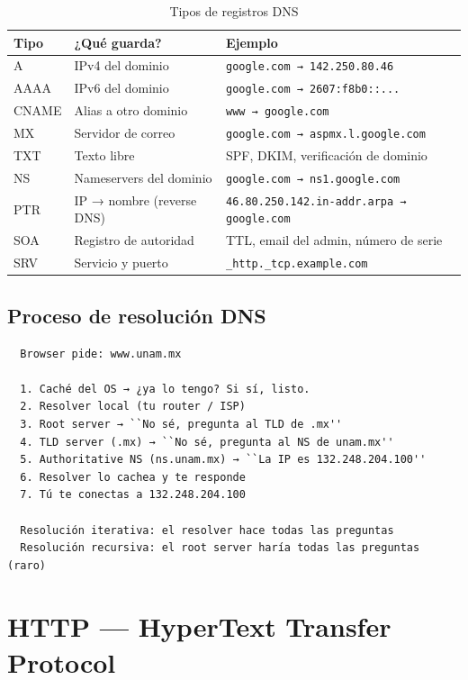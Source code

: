 \begin{table}[h!]
\centering
\renewcommand{\arraystretch}{1.3}
\begin{tabular}{lll}
\toprule
\textbf{Tipo} & \textbf{¿Qué guarda?} & \textbf{Ejemplo} \\
\midrule
A     & IPv4 del dominio           & \texttt{google.com → 142.250.80.46} \\
AAAA  & IPv6 del dominio           & \texttt{google.com → 2607:f8b0::...} \\
CNAME & Alias a otro dominio       & \texttt{www → google.com} \\
MX    & Servidor de correo         & \texttt{google.com → aspmx.l.google.com} \\
TXT   & Texto libre                & SPF, DKIM, verificación de dominio \\
NS    & Nameservers del dominio    & \texttt{google.com → ns1.google.com} \\
PTR   & IP → nombre (reverse DNS) & \texttt{46.80.250.142.in-addr.arpa → google.com} \\
SOA   & Registro de autoridad      & TTL, email del admin, número de serie \\
SRV   & Servicio y puerto          & \texttt{\_http.\_tcp.example.com} \\
\bottomrule
\end{tabular}
\caption{Tipos de registros DNS}
\end{table}

\subsection{Proceso de resolución DNS}

\begin{lstlisting}
  Browser pide: www.unam.mx

  1. Caché del OS → ¿ya lo tengo? Si sí, listo.
  2. Resolver local (tu router / ISP)
  3. Root server → ``No sé, pregunta al TLD de .mx''
  4. TLD server (.mx) → ``No sé, pregunta al NS de unam.mx''
  5. Authoritative NS (ns.unam.mx) → ``La IP es 132.248.204.100''
  6. Resolver lo cachea y te responde
  7. Tú te conectas a 132.248.204.100

  Resolución iterativa: el resolver hace todas las preguntas
  Resolución recursiva: el root server haría todas las preguntas (raro)
\end{lstlisting}

\section{ HTTP --- HyperText Transfer Protocol}

